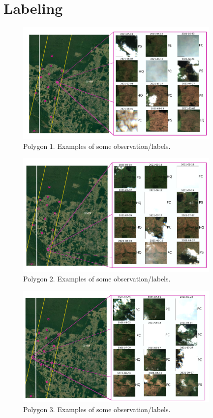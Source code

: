 \documentclass{beamer}
\begin{document}
\section{Labeling}
\begin{frame}
    \begin{figure}
        \includegraphics[width=10cm]{Figures/v3/labeling/polygon_0.pdf}
        \caption{Polygon 1. Examples of some observation/labels.}  
        \centering
    \end{figure}
\end{frame}

\begin{frame}
    \begin{figure}
        \includegraphics[width=10cm]{Figures/v3/labeling/polygon_2.pdf}
        \caption{Polygon 2. Examples of some observation/labels.}  
        \centering
    \end{figure}
\end{frame}

\begin{frame}
    \begin{figure}
        \includegraphics[width=10cm]{Figures/v3/labeling/polygon_4.pdf}
        \caption{Polygon 3. Examples of some observation/labels.}  
        \centering
    \end{figure}
\end{frame}
\end{document}
